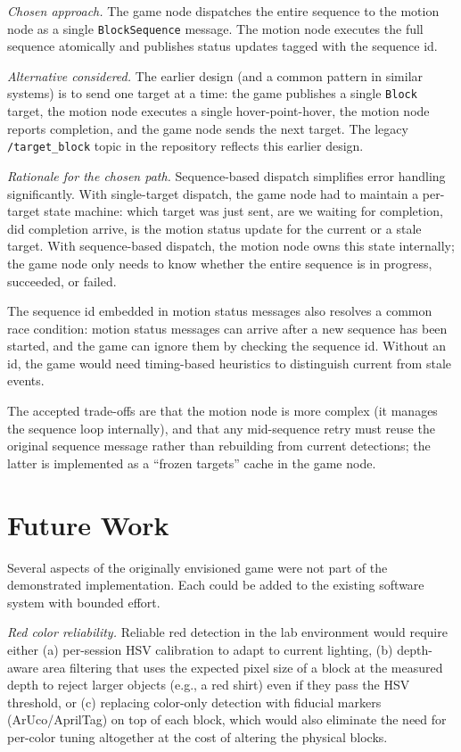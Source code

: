 \documentclass[conference]{IEEEtran}
\begin{document}
\textit{Chosen approach.} The game node dispatches the entire
sequence to the motion node as a single \texttt{BlockSequence} message.
The motion node executes the full sequence atomically and publishes
status updates tagged with the sequence id.

\textit{Alternative considered.} The earlier design (and a common
pattern in similar systems) is to send one target at a time: the
game publishes a single \texttt{Block} target, the motion node
executes a single hover-point-hover, the motion node reports
completion, and the game node sends the next target. The legacy
\texttt{/target\_block} topic in the repository reflects this earlier
design.

\textit{Rationale for the chosen path.} Sequence-based dispatch
simplifies error handling significantly. With single-target dispatch,
the game node had to maintain a per-target state machine: which
target was just sent, are we waiting for completion, did completion
arrive, is the motion status update for the current or a stale target.
With sequence-based dispatch, the motion node owns this state
internally; the game node only needs to know whether the entire
sequence is in progress, succeeded, or failed.

The sequence id embedded in motion status messages also resolves a
common race condition: motion status messages can arrive after a
new sequence has been started, and the game can ignore them by checking
the sequence id. Without an id, the game would need timing-based
heuristics to distinguish current from stale events.

The accepted trade-offs are that the motion node is more complex
(it manages the sequence loop internally), and that any mid-sequence
retry must reuse the original sequence message rather than rebuilding
from current detections; the latter is implemented as a ``frozen
targets'' cache in the game node.

\section{Future Work}
\label{sec:future}

Several aspects of the originally envisioned game were not part of the
demonstrated implementation. Each could be added to the existing
software system with bounded effort.

\textit{Red color reliability.} Reliable red detection in the lab
environment would require either (a) per-session HSV calibration to
adapt to current lighting, (b) depth-aware area filtering that uses
the expected pixel size of a block at the measured depth to reject
larger objects (e.g., a red shirt) even if they pass the HSV threshold,
or (c) replacing color-only detection with fiducial markers
(ArUco/AprilTag) on top of each block, which would also eliminate the
need for per-color tuning altogether at the cost of altering the
physical blocks.
\end{document}
